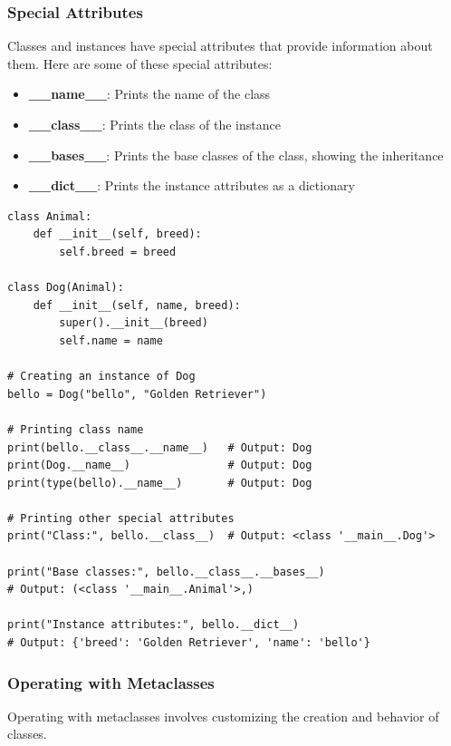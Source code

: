 \subsubsection{Special Attributes}
Classes and instances have special attributes that provide information about them. Here are some of these special attributes:

\begin{itemize}
    \item \textbf{\_\_name\_\_}: Prints the name of the class
    \item \textbf{\_\_class\_\_}: Prints the class of the instance
    \item \textbf{\_\_bases\_\_}: Prints the base classes of the class, showing the inheritance
    \item \textbf{\_\_dict\_\_}: Prints the instance attributes as a dictionary
\end{itemize}

\begin{codebox}
\begin{verbatim}
class Animal:
    def __init__(self, breed):
        self.breed = breed

class Dog(Animal):
    def __init__(self, name, breed):
        super().__init__(breed)
        self.name = name

# Creating an instance of Dog
bello = Dog("bello", "Golden Retriever")

# Printing class name
print(bello.__class__.__name__)   # Output: Dog
print(Dog.__name__)               # Output: Dog
print(type(bello).__name__)       # Output: Dog

# Printing other special attributes
print("Class:", bello.__class__)  # Output: <class '__main__.Dog'>

print("Base classes:", bello.__class__.__bases__)  
# Output: (<class '__main__.Animal'>,)

print("Instance attributes:", bello.__dict__)      
# Output: {'breed': 'Golden Retriever', 'name': 'bello'}
\end{verbatim}
\end{codebox}

\newpage
\subsubsection{Operating with Metaclasses}
Operating with metaclasses involves customizing the creation and behavior of classes.

